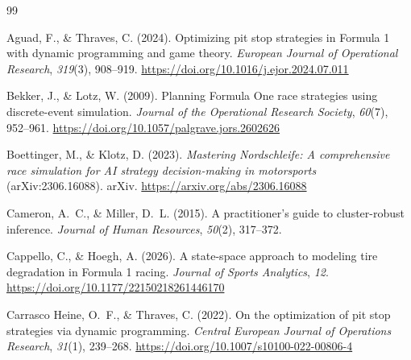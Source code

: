 \documentclass[11pt,a4paper]{article}
\begin{document}
\singlespacing
\nolinenumbers



\begin{thebibliography}{99}


Aguad, F., \& Thraves, C. (2024). Optimizing pit stop strategies in Formula 1
with dynamic programming and game theory. \emph{European Journal of
Operational Research}, \emph{319}(3), 908--919.
\url{https://doi.org/10.1016/j.ejor.2024.07.011}

Bekker, J., \& Lotz, W. (2009). Planning Formula One race strategies using
discrete-event simulation. \emph{Journal of the Operational Research Society},
\emph{60}(7), 952--961.
\url{https://doi.org/10.1057/palgrave.jors.2602626}

Boettinger, M., \& Klotz, D. (2023). \emph{Mastering Nordschleife: A
comprehensive race simulation for AI strategy decision-making in motorsports}
(arXiv:2306.16088). arXiv. \url{https://arxiv.org/abs/2306.16088}

Cameron, A.~C., \& Miller, D.~L. (2015). A practitioner's guide to
cluster-robust inference. \emph{Journal of Human Resources}, \emph{50}(2),
317--372.

Cappello, C., \& Hoegh, A. (2026). A state-space approach to modeling tire
degradation in Formula 1 racing. \emph{Journal of Sports Analytics},
\emph{12}. \url{https://doi.org/10.1177/22150218261446170}

Carrasco Heine, O.~F., \& Thraves, C. (2022). On the optimization of pit stop
strategies via dynamic programming. \emph{Central European Journal of
Operations Research}, \emph{31}(1), 239--268.
\url{https://doi.org/10.1007/s10100-022-00806-4}


\end{thebibliography}
\end{document}
